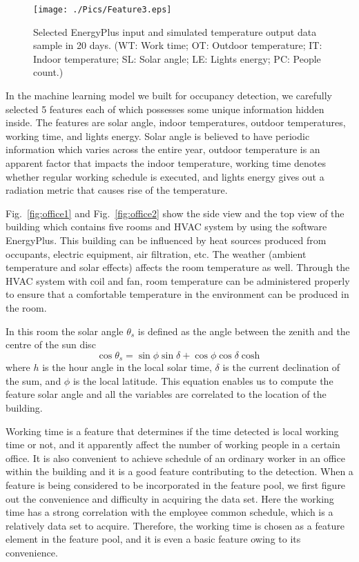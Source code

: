 \begin{figure}[h]
\centering
\texttt{[image: ./Pics/Feature3.eps]}
\caption{Selected EnergyPlus input and simulated temperature output data sample in 20 days. (WT: Work time; OT: Outdoor temperature; IT: Indoor temperature; SL: Solar angle; LE: Lights energy; PC: People count.)}
\label{fig:feature}
\end{figure}

In the machine learning model we built for occupancy detection, we
carefully selected 5 features each of which possesses some unique
information hidden inside. The features are solar angle, indoor
temperatures, outdoor temperatures, working time, and lights energy.
Solar angle is believed to have periodic information which varies
across the entire year, outdoor temperature is an apparent factor that
impacts the indoor temperature, working time denotes whether regular
working schedule is executed, and lights energy gives out a radiation
metric that causes rise of the temperature.

Fig.~\ref{fig:office1} and Fig.~\ref{fig:office2} show the side view
and the top view of the building which contains five rooms and HVAC
system by using the software EnergyPlus. This building can be
influenced by heat sources produced from occupants, electric
equipment, air filtration, etc. The weather (ambient temperature and
solar effects) affects the room temperature as well. Through the HVAC
system with coil and fan, room temperature can be administered
properly to ensure that a comfortable temperature in the environment
can be produced in the room.

In this room the solar angle ${\theta _s}$ is defined as the angle between the zenith and the centre of the sun disc
\begin{equation}
    \cos {\theta _s} = \sin \phi \sin \delta  + \cos \phi \cos \delta \cosh
\end{equation}
where $h$ is the hour angle in the local solar time, $\delta$ is the
current declination of the sum, and $\phi$ is the local latitude. This
equation enables us to compute the feature solar angle and all the
variables are correlated to the location of the building.

Working time is a feature that determines if the time detected is
local working time or not, and it apparently affect the number of
working people in a certain office. It is also convenient to achieve
schedule of an ordinary worker in an office within the building and it
is a good feature contributing to the detection. When a feature is
being considered to be incorporated in the feature pool, we first
figure out the convenience and difficulty in acquiring the data set.
Here the working time has a strong correlation with the employee common
schedule, which is a relatively data set to acquire. Therefore, the
working time is chosen as a feature element in the feature pool, and
it is even a basic feature owing to its convenience.

